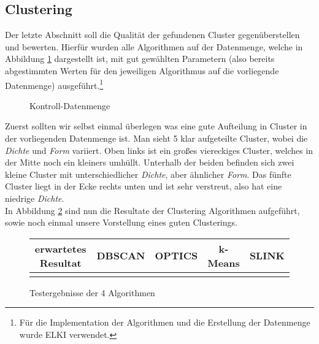 \documentclass{lni}
\begin{document}

\subsection{Clustering}

Der letzte Abschnitt soll die Qualität der gefundenen Cluster gegenüberstellen und bewerten. Hierfür wurden alle Algorithmen auf der Datenmenge, welche in Abbildung \ref{fig:5} dargestellt ist, mit gut gewählten Parametern (also bereits abgestimmten Werten für den jeweiligen Algorithmus auf die vorliegende Datenmenge) ausgeführt.\footnote{Für die Implementation der Algorithmen und die Erstellung der Datenmenge wurde ELKI\cite{ELKI} verwendet.}

\begin{figure}[H]
    \centering
    
    \caption{Kontroll-Datenmenge}
    \label{fig:5}
\end{figure}

Zuerst sollten wir selbst einmal überlegen was eine \glqq gute\grqq{} Aufteilung in Cluster in der vorliegenden Datenmenge ist. Man sieht 5 klar aufgeteilte Cluster, wobei die \textit{Dichte} und \textit{Form} variiert. Oben links ist ein großes viereckiges Cluster, welches in der Mitte noch ein kleiners umhüllt. Unterhalb der beiden befinden sich zwei kleine Cluster mit unterschiedlicher \textit{Dichte}, aber ähnlicher \textit{Form}. Das fünfte Cluster liegt in der Ecke rechts unten und ist sehr verstreut, also hat eine niedrige \textit{Dichte}.\\
In Abbildung \ref{fig:6} sind nun die Resultate der Clustering Algorithmen aufgeführt, sowie noch einmal unsere Vorstellung eines guten Clusterings.

\begin{figure}[H]
    \centering
    \begin{tabular}{|c|c|c|c|c|}
        \hline
        erwartetes Resultat & DBSCAN & OPTICS & k-Means & SLINK\\
        \hline  
        \raisebox{-\totalheight}{} &
        \raisebox{-\totalheight}{} &
        \raisebox{-\totalheight}{} &
        \raisebox{-\totalheight}{} &
        \raisebox{-\totalheight}{}\\
        \hline
    \end{tabular}
    \caption{Testergebnisse der 4 Algorithmen}
    \label{fig:6}
\end{figure}
\end{document}
